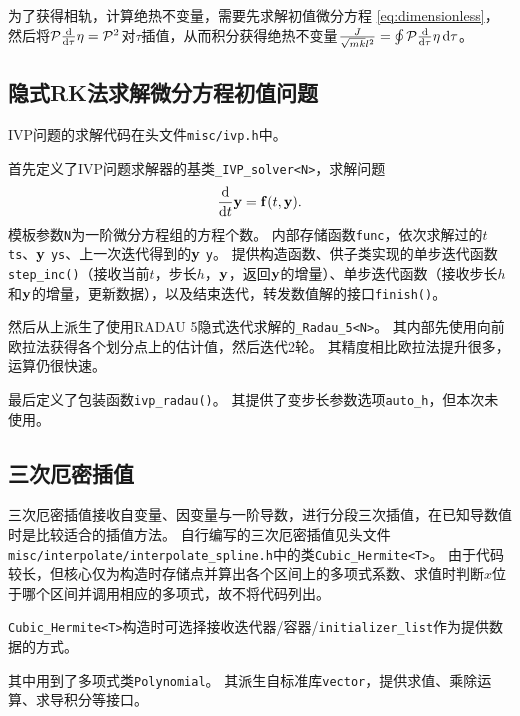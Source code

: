 \documentclass[a4paper,unicode]{report}
\begin{document}
为了获得相轨，计算绝热不变量，需要先求解初值微分方程 \eqref{eq:dimensionless}，然后将$\mathcal{P}\dv{\tau}\eta=\mathcal{P}^2$对$\tau$插值，从而积分获得绝热不变量$\frac{J}{\sqrt{mk}l^2} = \oint \mathcal{P}\dv{\tau}\eta \dd{\tau}$。

\subsection{隐式RK法求解微分方程初值问题}
IVP问题的求解代码在头文件\verb|misc/ivp.h|中。

首先定义了IVP问题求解器的基类\verb|_IVP_solver<N>|，求解问题
\begin{equation}
    \dv{t}\vb{y} =  \vb{f}(t, \vb{y}).
\end{equation}
模板参数\verb|N|为一阶微分方程组的方程个数。
内部存储函数\verb|func|，依次求解过的$t$ \verb|ts|、$\vb{y}$ \verb|ys|、上一次迭代得到的$\vb{y}$ \verb|y|。
提供构造函数、供子类实现的单步迭代函数\verb|step_inc()|（接收当前$t$，步长$h$，$\vb{y}$，返回$\vb{y}$的增量）、单步迭代函数（接收步长$h$和$\vb{y}$的增量，更新数据），以及结束迭代，转发数值解的接口\verb|finish()|。
{
    \linespread{1.0}
    
}

然后从上派生了使用RADAU 5隐式迭代求解的\verb|_Radau_5<N>|。
其内部先使用向前欧拉法获得各个划分点上的估计值，然后迭代2轮。
其精度相比欧拉法提升很多，运算仍很快速。
{
    \linespread{1.0}
    
}

最后定义了包装函数\verb|ivp_radau()|。
其提供了变步长参数选项\verb|auto_h|，但本次未使用。
{
    \linespread{1.0}
    
}

\subsection{三次厄密插值}
三次厄密插值接收自变量、因变量与一阶导数，进行分段三次插值，在已知导数值时是比较适合的插值方法。
自行编写的三次厄密插值见头文件\verb|misc/interpolate/interpolate_spline.h|中的类\verb|Cubic_Hermite<T>|。
由于代码较长，但核心仅为构造时存储点并算出各个区间上的多项式系数、求值时判断$x$位于哪个区间并调用相应的多项式，故不将代码列出。

\verb|Cubic_Hermite<T>|构造时可选择接收迭代器/容器/\verb|initializer_list|作为提供数据的方式。

其中用到了多项式类\verb|Polynomial|。
其派生自标准库\verb|vector|，提供求值、乘除运算、求导积分等接口。
\end{document}
